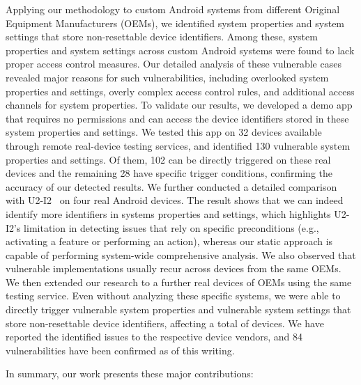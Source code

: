 Applying our methodology to \datasetsize custom Android systems from \totalbrand different Original Equipment Manufacturers (OEMs), 
we identified \totalsensitivepropertiescase system properties and \totalsensitivesettingscase system settings that store non-resettable device identifiers. 
Among these, \totaldangerouspropertiescase system properties and \totaldangeroussettingscase system settings across \totaldangerousdevices custom Android systems were found to lack proper access control measures.
Our detailed analysis of these vulnerable cases revealed major reasons for such vulnerabilities, including overlooked system properties and settings, overly complex access control rules, and additional access channels for system properties. 
To validate our results, we developed a demo app that requires no permissions and can access the device identifiers stored in these system properties and settings. We tested this app on 32 devices available through remote real-device testing services, and identified 130 vulnerable system properties and settings.
Of them, 102 can be directly triggered on these real devices and the remaining 28 have specific trigger conditions, confirming the accuracy of our detected results.
We further conducted a detailed comparison with U2-I2~\cite{meng2023post} on four real Android devices. The result shows that we can indeed identify more identifiers in systems properties and settings, which highlights U2-I2’s limitation in detecting issues that rely on specific preconditions (e.g., activating a feature or performing an action), whereas our static approach is capable of performing system-wide comprehensive analysis.
We also observed that vulnerable implementations usually recur across devices from the same OEMs. We then extended our research to a further \dynamicmodels real devices of \dynamicbrands OEMs using the same testing service. 
Even without analyzing these specific systems, we were able to directly trigger \dynamicpropertiescase vulnerable system properties and \dynamicsettingscase vulnerable system settings that store non-resettable device identifiers, affecting a total of \dynamictotal devices. 
We have reported the identified issues to the respective device vendors, and 84 vulnerabilities have been confirmed as of this writing. 

In summary, our work presents these major contributions:

